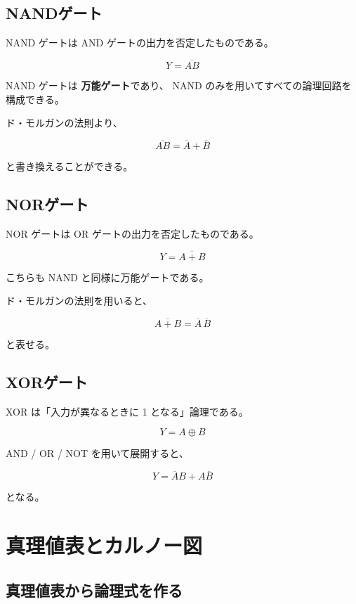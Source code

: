 \subsection{NANDゲート}

NAND ゲートは AND ゲートの出力を否定したものである。


\[
Y = \overline{AB}
\]

NAND ゲートは \textbf{万能ゲート}であり、
NAND のみを用いてすべての論理回路を構成できる。

ド・モルガンの法則より、

\[
\overline{AB} = \overline{A} + \overline{B}
\]

と書き換えることができる。

\subsection{NORゲート}

NOR ゲートは OR ゲートの出力を否定したものである。

\[
Y = \overline{A + B}
\]

こちらも NAND と同様に万能ゲートである。

ド・モルガンの法則を用いると、

\[
\overline{A + B} = \overline{A}\,\overline{B}
\]

と表せる。

\subsection{XORゲート}

XOR は「入力が異なるときに 1 となる」論理である。

\[
Y = A \oplus B
\]

AND / OR / NOT を用いて展開すると、

\[
Y = \overline{A}B + A\overline{B}
\]

となる。



\section{真理値表とカルノー図}
\subsection{真理値表から論理式を作る}

